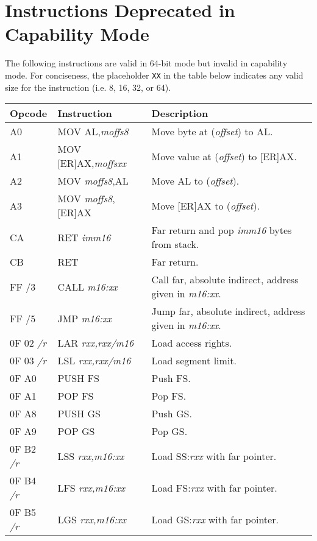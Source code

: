 \clearpage
\section{Instructions Deprecated in Capability Mode}

The following instructions are valid in 64-bit mode but invalid in
capability mode.  For conciseness, the placeholder \texttt{XX} in the
table below indicates any valid size for the instruction (i.e. 8, 16, 32,
or 64).

\bigskip
\noindent
\begin{tabularx}{\textwidth}{| l | l | Z |} \hline
  \textbf{Opcode} & \textbf{Instruction} &
  \textbf{Description}\\
  \hline
  A0 & MOV AL,\emph{moffs8} & Move byte at (\emph{offset}) to AL.\\
  \hline
  A1 & MOV [ER]AX,\emph{moffsxx} & Move value at (\emph{offset}) to [ER]AX.\\
  \hline
  A2 & MOV \emph{moffs8},AL & Move AL to  (\emph{offset}).\\
  \hline
  A3 & MOV \emph{moffs8},[ER]AX & Move [ER]AX to  (\emph{offset}).\\
  \hline
  CA & RET \emph{imm16} &
  Far return and pop \emph{imm16} bytes from stack.\\
  \hline
  CB & RET & Far return.\\
  \hline
  FF /3 & CALL \emph{m16:xx} &
  Call far, absolute indirect, address given in \emph{m16:xx}.\\
  \hline
  FF /5 & JMP \emph{m16:xx} &
  Jump far, absolute indirect, address given in \emph{m16:xx}.\\
  \hline
  0F 02 \emph{/r} & LAR \emph{rxx,rxx/m16} &
  Load access rights.\\
  \hline
  0F 03 \emph{/r} & LSL \emph{rxx,rxx/m16} &
  Load segment limit.\\
  \hline
  0F A0 & PUSH FS & Push FS.\\
  \hline
  0F A1 & POP FS & Pop FS.\\
  \hline
  0F A8 & PUSH GS & Push GS.\\
  \hline
  0F A9 & POP GS & Pop GS.\\
  \hline
  0F B2 \emph{/r} & LSS \emph{rxx,m16:xx} &
  Load SS:\emph{rxx} with far pointer.\\
  \hline
  0F B4 \emph{/r} & LFS \emph{rxx,m16:xx} &
  Load FS:\emph{rxx} with far pointer.\\
  \hline
  0F B5 \emph{/r} & LGS \emph{rxx,m16:xx} &
  Load GS:\emph{rxx} with far pointer.\\
  \hline
\end{tabularx}
